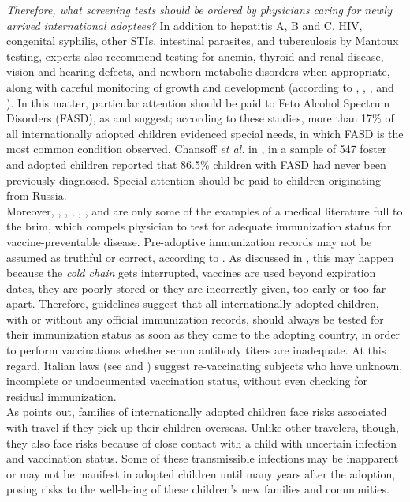 \textit{Therefore, what screening tests should be ordered by physicians caring for newly arrived international adoptees?} In addition to hepatitis A, B and C, HIV, congenital syphilis, other STIs, intestinal parasites, and tuberculosis by Mantoux testing, experts also recommend testing for anemia, thyroid and renal disease, vision and hearing defects, and newborn metabolic disorders when appropriate, along with careful monitoring of growth and development (according to \cite{caringfor}, \cite{medicalscreening}, \cite{notonlyinfectious}, and \cite{nonsoloinfezioni}). In this matter, particular attention should be paid to Feto Alcohol Spectrum Disorders (FASD), as \cite{notonlyinfectious} and \cite{nonsoloinfezioni} suggest; according to these studies, more than 17\% of all internationally adopted children evidenced special needs, in which FASD is the most common condition observed. Chansoff \textit{et al.} in \cite{misdiagnosis}, in a sample of 547 foster and adopted children reported that 86.5\% children with FASD had never been previously diagnosed. Special attention should be paid to children originating from Russia.\\
Moreover, \cite{caringfor}, \cite{medicalscreening}, \cite{initialeval}, \cite{immunizationstatus}, \cite{comphealtheval}, and \cite{immunizationstillinsufficient} are only some of the examples of a medical literature full to the brim, which compels physician to test for adequate immunization status for vaccine-preventable disease. Pre-adoptive immunization records may not be assumed as truthful or correct, according to \cite{immunizationstatus}. As discussed in \cite{comphealtheval}, this may happen because the \textit{cold chain} gets interrupted, vaccines are used beyond expiration dates, they are poorly stored or they are incorrectly given, too early or too far apart. Therefore, guidelines suggest that all internationally adopted children, with or without any official immunization records, should always be tested for their immunization status as soon as they come to the adopting country, in order to perform vaccinations whether serum antibody titers are inadequate. At this regard, Italian laws (see \cite{circolareministeriale} and \cite{centroprevenzione}) suggest re-vaccinating subjects who have unknown, incomplete or undocumented vaccination status, without even checking for residual immunization.\\
As \cite{preventing} points out, families of internationally adopted children face risks associated with travel if they pick up their children overseas. Unlike other travelers, though, they also face risks because of close contact with a child with uncertain infection and vaccination status. Some of these transmissible infections may be inapparent or may not be manifest in adopted children until many years after the adoption, posing risks to the well-being of these children's new families and communities.


